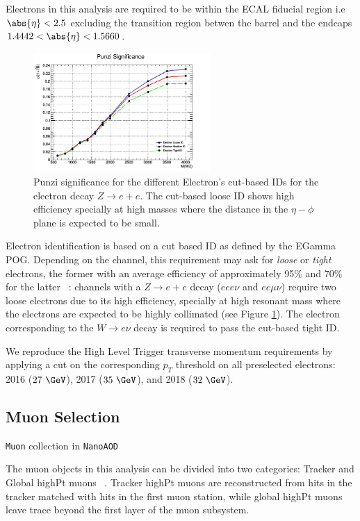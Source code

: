 Electrons in this analysis are required to be within the ECAL fiducial
region i.e $\abs{\eta}<2.5$ excluding the transition region betwen the
barrel and the endcaps $1.4442<\abs{\eta}<1.5660$.

\begin{figure}[tph]
  \centering
  \includegraphics[width=0.6\textwidth]{fig/LeptonIDStudies/ElectronIDPunzi.png}
  \caption{Punzi significance for the different Electron's cut-based IDs for the
    electron decay $Z\rightarrow e+e$. The cut-based loose ID shows high efficiency
    specially at high masses where the distance in the $\eta-\phi$ plane is
    expected to be small.}
  \label{fig:PunziElectronIDs}
\end{figure}

Electron identification is based on a cut based ID as defined by the
EGamma POG. Depending on the channel, this requirement
may ask for \emph{loose} or \emph{tight} electrons, the former with an
average efficiency of approximately 95\% and 70\% for
the latter ~\cite{EGammaPOG_el}: channels with a $Z\rightarrow e+e$
decay ($eee\nu$ and $ee\mu\nu$) require two loose
electrons due to its high efficiency, specially at high resonant mass where
the electrons are expected to be highly collimated (see Figure \ref{fig:PunziElectronIDs}).
The electron corresponding to the $W\rightarrow e\nu$ decay is required to pass
the cut-based tight ID.

We reproduce the High Level Trigger transverse momentum requirements by
applying a cut on the corresponding $p_T$ threshold on all
preselected electrons:
2016 ($27~\GeV$), 2017 ($35~\GeV$), and 2018 ($32~\GeV$).

\subsection{Muon Selection}

\verb|Muon| collection in \verb|NanoAOD|

The muon objects in this analysis can be divided into two categories:
Tracker and Global highPt muons ~\cite{MuonPOG}. Tracker highPt muons are
reconstructed from hits in the tracker matched with hits in the first
muon station, while global highPt muons leave trace beyond the first
layer of the muon subsystem.

